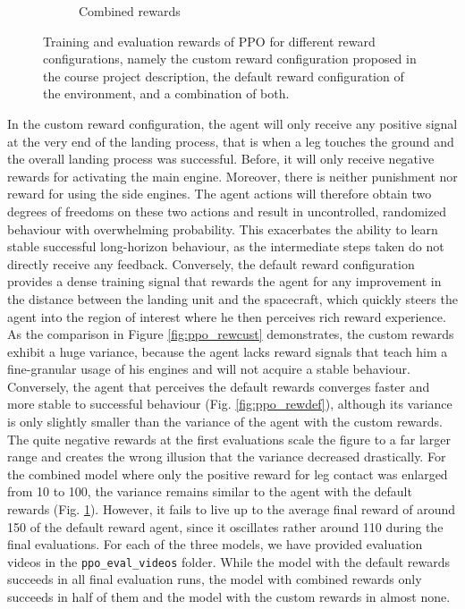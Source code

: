 \documentclass[a4paper, 11pt]{article}
\begin{document}
\begin{figure}[H]
\begin{center}
\begin{subfigure}{0.48\textwidth}
		\caption{Combined rewards}
		\label{fig:ppo_rewcomb}
		\end{subfigure}
	\end{center}
		\caption{Training and evaluation rewards of PPO for different reward configurations, namely the custom reward configuration proposed in the course project description, the default reward configuration of the environment, and a combination of both.}
		\label{fig:ppo_reward}
	\end{figure}
	In the custom reward configuration, the agent will only receive any positive signal at the very end of the landing process, that is when a leg touches the ground and the overall landing process was successful. Before, it will only receive negative rewards for activating the main engine. Moreover, there is neither punishment nor reward for using the side engines. The agent actions will therefore obtain two degrees of freedoms on these two actions and result in uncontrolled, randomized behaviour with overwhelming probability.
	This exacerbates the ability to learn stable successful long-horizon behaviour, as the intermediate steps taken do not directly receive any feedback. Conversely, the default reward configuration provides a dense training signal that rewards the agent for any improvement in the distance between the landing unit and the spacecraft, which quickly steers the agent into the region of interest where he then perceives rich reward experience. As the comparison in Figure \ref{fig:ppo_rewcust} demonstrates, the custom rewards exhibit a huge variance, because the agent lacks reward signals that teach him a fine-granular usage of his engines and will not acquire a stable behaviour. Conversely, the agent that perceives the default rewards converges faster and more stable to successful behaviour (Fig. \ref{fig:ppo_rewdef}), although its variance is only slightly smaller than the variance of the agent with the custom rewards. The quite negative rewards at the first evaluations scale the figure to a far larger range and creates the wrong illusion that the variance decreased drastically. For the combined model where only the positive reward for leg contact was enlarged from 10 to 100, the variance remains similar to the agent with the default rewards (Fig. \ref{fig:ppo_rewcomb}). However, it fails to live up to the average final reward of around 150 of the default reward agent, since it oscillates rather around 110 during the final evaluations. 
	For each of the three models, we have provided evaluation videos in the \texttt{ppo\_eval\_videos} folder. While the model with the default rewards succeeds in all final evaluation runs, the model with combined rewards only succeeds in half of them and the model with the custom rewards in almost none.
\end{document}
